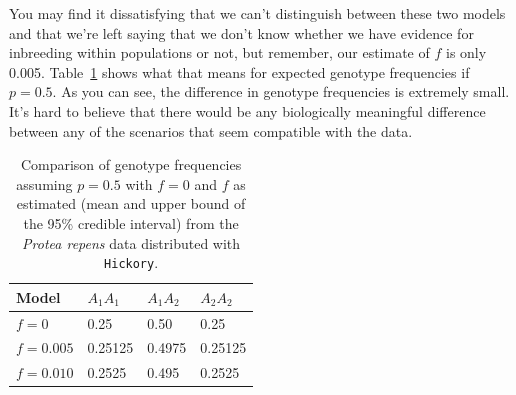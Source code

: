 You may find it dissatisfying that we can't distinguish between these
two models and that we're left saying that we don't know whether we
have evidence for inbreeding within populations or not, but remember,
our estimate of $f$ is only
0.005. Table~\ref{table:f-model-comparison} shows what that means for
expected genotype frequencies if $p = 0.5$. As you can see, the
difference in genotype frequencies is extremely small. It's hard to
believe that there would be any biologically meaningful difference
between any of the scenarios that seem compatible with the data.

\begin{table}
  \begin{center}
    \begin{tabular}{l|lll}
      \hline\hline
      Model       & $A_1A_1$ & $A_1A_2$ & $A_2A_2$ \\
      \hline
      $f = 0$     & 0.25     & 0.50    & 0.25 \\
      $f = 0.005$ & 0.25125  & 0.4975  & 0.25125 \\
      $f = 0.010$ & 0.2525   & 0.495   & 0.2525 \\
      \hline
    \end{tabular}
  \end{center}
  \caption{Comparison of genotype frequencies assuming $p = 0.5$ with
    $f = 0$ and $f$ as estimated (mean and upper bound of the 95\%
    credible interval) from the {\it Protea repens\/} data distributed
    with {\tt Hickory}.}\label{table:f-model-comparison}
\end{table}

